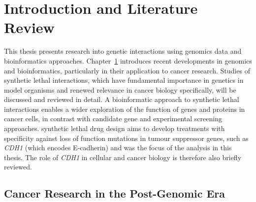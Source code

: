 \chapter{Introduction and Literature Review}
\label{chap:intro}



This thesis presents research into genetic interactions using \glspl{genomic} data and \gls{bioinformatics} approaches. Chapter~\ref{chap:intro} introduces recent developments in \glspl{genomic} and \gls{bioinformatics}, particularly in their application to \gls{cancer} research. Studies of \gls{synthetic lethal} interactions, which have fundamental importance in genetics in model organisms and renewed relevance in \gls{cancer} biology specifically, will be discussed and reviewed in detail.
A bioinformatic approach to \gls{synthetic lethal} interactions enables a wider exploration of the function of genes and proteins in \gls{cancer} cells, in contrast with candidate gene and experimental screening approaches. \Gls{synthetic lethal} drug design aims to develop \glspl{treatment} with specificity against loss of function \glspl{mutation} in \gls{tumour suppressor} genes, such as \textit{CDH1} (which encodes \gls{E-cadherin}) and was the focus of the analysis in this thesis. The role of \textit{CDH1} in cellular and \gls{cancer} biology is therefore also briefly reviewed. 



\section{Cancer Research in the Post-Genomic Era}


